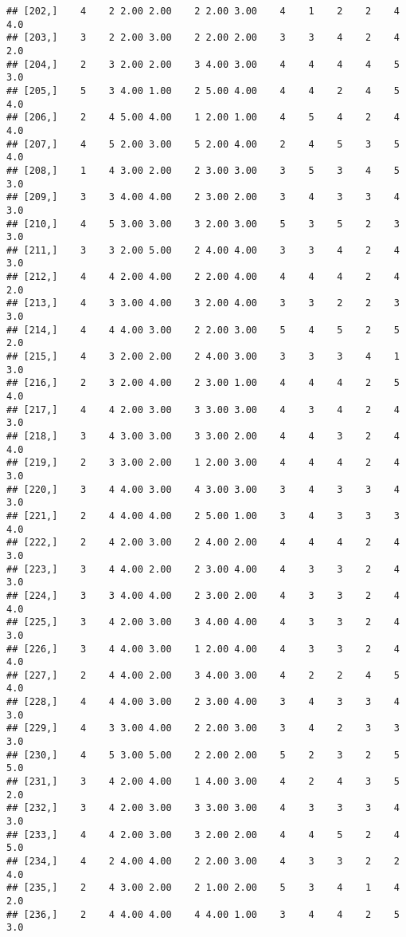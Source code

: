 \documentclass[]{article}
\begin{document}
\begin{verbatim}
## [202,]    4    2 2.00 2.00    2 2.00 3.00    4    1    2    2    4  4.0
## [203,]    3    2 2.00 3.00    2 2.00 2.00    3    3    4    2    4  2.0
## [204,]    2    3 2.00 2.00    3 4.00 3.00    4    4    4    4    5  3.0
## [205,]    5    3 4.00 1.00    2 5.00 4.00    4    4    2    4    5  4.0
## [206,]    2    4 5.00 4.00    1 2.00 1.00    4    5    4    2    4  4.0
## [207,]    4    5 2.00 3.00    5 2.00 4.00    2    4    5    3    5  4.0
## [208,]    1    4 3.00 2.00    2 3.00 3.00    3    5    3    4    5  3.0
## [209,]    3    3 4.00 4.00    2 3.00 2.00    3    4    3    3    4  3.0
## [210,]    4    5 3.00 3.00    3 2.00 3.00    5    3    5    2    3  3.0
## [211,]    3    3 2.00 5.00    2 4.00 4.00    3    3    4    2    4  3.0
## [212,]    4    4 2.00 4.00    2 2.00 4.00    4    4    4    2    4  2.0
## [213,]    4    3 3.00 4.00    3 2.00 4.00    3    3    2    2    3  3.0
## [214,]    4    4 4.00 3.00    2 2.00 3.00    5    4    5    2    5  2.0
## [215,]    4    3 2.00 2.00    2 4.00 3.00    3    3    3    4    1  3.0
## [216,]    2    3 2.00 4.00    2 3.00 1.00    4    4    4    2    5  4.0
## [217,]    4    4 2.00 3.00    3 3.00 3.00    4    3    4    2    4  3.0
## [218,]    3    4 3.00 3.00    3 3.00 2.00    4    4    3    2    4  4.0
## [219,]    2    3 3.00 2.00    1 2.00 3.00    4    4    4    2    4  3.0
## [220,]    3    4 4.00 3.00    4 3.00 3.00    3    4    3    3    4  3.0
## [221,]    2    4 4.00 4.00    2 5.00 1.00    3    4    3    3    3  4.0
## [222,]    2    4 2.00 3.00    2 4.00 2.00    4    4    4    2    4  3.0
## [223,]    3    4 4.00 2.00    2 3.00 4.00    4    3    3    2    4  3.0
## [224,]    3    3 4.00 4.00    2 3.00 2.00    4    3    3    2    4  4.0
## [225,]    3    4 2.00 3.00    3 4.00 4.00    4    3    3    2    4  3.0
## [226,]    3    4 4.00 3.00    1 2.00 4.00    4    3    3    2    4  4.0
## [227,]    2    4 4.00 2.00    3 4.00 3.00    4    2    2    4    5  4.0
## [228,]    4    4 4.00 3.00    2 3.00 4.00    3    4    3    3    4  3.0
## [229,]    4    3 3.00 4.00    2 2.00 3.00    3    4    2    3    3  3.0
## [230,]    4    5 3.00 5.00    2 2.00 2.00    5    2    3    2    5  5.0
## [231,]    3    4 2.00 4.00    1 4.00 3.00    4    2    4    3    5  2.0
## [232,]    3    4 2.00 3.00    3 3.00 3.00    4    3    3    3    4  3.0
## [233,]    4    4 2.00 3.00    3 2.00 2.00    4    4    5    2    4  5.0
## [234,]    4    2 4.00 4.00    2 2.00 3.00    4    3    3    2    2  4.0
## [235,]    2    4 3.00 2.00    2 1.00 2.00    5    3    4    1    4  2.0
## [236,]    2    4 4.00 4.00    4 4.00 1.00    3    4    4    2    5  3.0

\end{verbatim}
\end{document}
